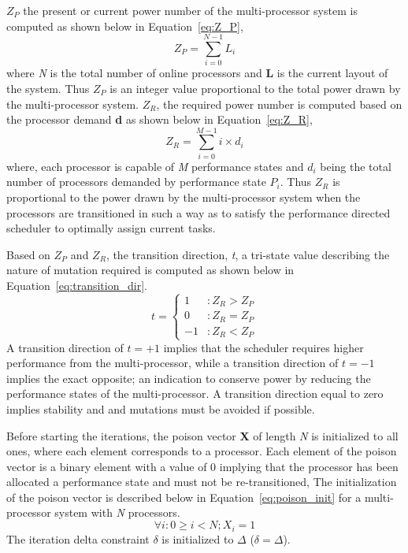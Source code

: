 $Z_P$ the present or current power number of the multi-processor system is computed as shown below in Equation~\eqref{eq:Z_P},
\begin{equation}
    Z_{P} = \displaystyle\sum_{i=0}^{N-1} {L_{i}} 
\label{eq:Z_P}
\end{equation}
where \textit{N} is the total number of online processors and \textbf{L} is the current layout of the system. Thus $Z_P$ 
is an integer value proportional to the total power drawn by the multi-processor system. $Z_R$, the required power number  is computed based on the 
processor demand \textbf{d} as shown below in Equation~\eqref{eq:Z_R},
\begin{equation}
    Z_{R} = \displaystyle\sum_{i=0}^{M-1} {i \times d_{i}} 
\label{eq:Z_R}
\end{equation}
where, each processor is capable of \textit{M} performance states and $d_i$ being the total number of processors demanded
by performance state $P_i$. Thus $Z_R$ is proportional to the power drawn by the multi-processor system when the processors
are transitioned in such a way as to satisfy the performance directed scheduler to optimally assign current tasks. 

Based on $Z_{P}$ and $Z_{R}$, the transition direction, \textit{t}, a tri-state value describing the nature of 
mutation required is computed as shown below in Equation~\eqref{eq:transition_dir}. 
\begin{equation}
    t = \left\{
     \begin{array}{lr}
       1 & : Z_{R} > Z_{P}\\
       0 & : Z_{R} = Z_{P} \\
       -1 & : Z_{R} < Z_{P}
     \end{array}
   \right.
\label{eq:transition_dir}
\end{equation}
A transition direction of $t = +1$ implies that the scheduler requires higher performance from
the multi-processor, while a transition direction of $t = -1$ implies the exact opposite; an indication
to conserve power by reducing the performance states of the multi-processor. A transition direction equal to zero
implies stability and and mutations must be avoided if possible. 

Before starting the iterations, the poison vector \textbf{X} of length \textit{N} is initialized to all ones, where
each element corresponds to a processor. Each element of the poison vector is a binary element with a value of 0 
implying that the processor has been allocated a performance state and must not be re-transitioned, The initialization
of the poison vector is described below in Equation~\eqref{eq:poison_init} for a multi-processor system with \textit{N} processors.
\begin{equation}
    \forall i : 0 \geq i < N; X_{i} = 1 
\label{eq:poison_init}
\end{equation}
The iteration delta constraint $\delta$ is initialized to $\Delta$  ($\delta = \Delta$). 

